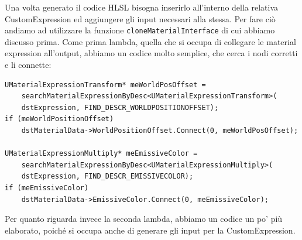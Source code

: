 \documentclass[main.tex]{subfiles}
\begin{document}
Una volta generato il codice HLSL bisogna inserirlo all'interno della relativa CustomExpression ed aggiungere gli input necessari alla stessa. Per fare ciò andiamo ad utilizzare la funzione \lstinline{cloneMaterialInterface} di cui abbiamo discusso prima. Come prima lambda, quella che si occupa di collegare le material expression all'output, abbiamo un codice molto semplice, che cerca i nodi corretti e li connette:
\begin{lstlisting}
UMaterialExpressionTransform* meWorldPosOffset =
    searchMaterialExpressionByDesc<UMaterialExpressionTransform>(
    dstExpression, FIND_DESCR_WORLDPOSITIONOFFSET);
if (meWorldPositionOffset)
    dstMaterialData->WorldPositionOffset.Connect(0, meWorldPosOffset);

UMaterialExpressionMultiply* meEmissiveColor =
    searchMaterialExpressionByDesc<UMaterialExpressionMultiply>(
    dstExpression, FIND_DESCR_EMISSIVECOLOR);
if (meEmissiveColor)
    dstMaterialData->EmissiveColor.Connect(0, meEmissiveColor);
\end{lstlisting}

Per quanto riguarda invece la seconda lambda, abbiamo un codice un po' più elaborato, poiché si occupa anche di generare gli input per la CustomExpression. \newline
    
\end{document}
